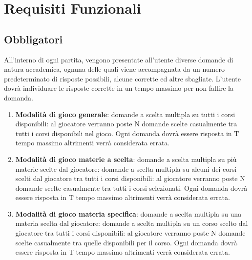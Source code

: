 	\section{Requisiti Funzionali} 
        \subsection{Obbligatori}
        All’interno di ogni partita, vengono presentate all’utente diverse domande di natura accademica, ognuna delle quali viene accompagnata da un numero predeterminato di risposte possibili, alcune corrette ed altre sbagliate. L’utente dovrà individuare le risposte corrette in un tempo massimo per non fallire la domanda. 

        \begin{enumerate}
            \item \textbf{Modalità di gioco generale}: domande a scelta multipla su tutti i corsi disponibili: al giocatore verranno poste N domande scelte casualmente tra tutti i corsi disponibili nel gioco. Ogni domanda dovrà essere risposta in T tempo massimo altrimenti verrà considerata errata.
            
            \item \textbf{Modalità di gioco materie a scelta}: domande a scelta multipla su più materie scelte dal giocatore: domande a scelta multipla su alcuni dei corsi scelti dal giocatore tra tutti i corsi disponibili: al giocatore verranno poste N domande scelte casualmente tra tutti i corsi selezionati. Ogni domanda dovrà essere risposta in T tempo massimo altrimenti verrà considerata errata.
            
            \item \textbf{Modalità di gioco materia specifica}: domande a scelta multipla su una materia scelta dal giocatore: domande a scelta multipla su un corso scelto dal giocatore tra tutti i corsi disponibili: al giocatore verranno poste N domande scelte casualmente tra quelle disponibili per il corso. Ogni domanda dovrà essere risposta in T tempo massimo altrimenti verrà considerata errata.


\end{enumerate}
